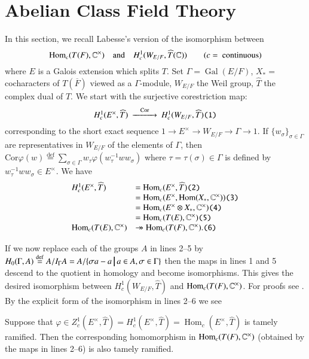 \documentclass{amsart}
\newenvironment{cthm}[1]
  {\renewcommand\thethm{\bf #1}\thm}
  {\endthm}
\def\taglet#1{\text{\tt (#1)}}
\def\Gal{\operatorname{\text{Gal}}}          %
\def\Com{{\Bbb C}}                         %
\def\suchthat{\ {\vrule width1truept height.3truecm depth.1truecm}\ }
\def\Hom{\operatorname{Hom}}         %
\def\Def{\overset{\operatorname{def}}=}   %
\def\LABESSEC{19}
\begin{document}
\section{Abelian Class Field Theory} %

In this section, we recall Labesse's version \cite{\LABESSEC} of the isomorphism
between
$$
\Hom_c(T(F),\Com^\times)\quad\text{and}\quad
H_c^1(W_{E/F},\widehat T(\Com))
\qquad (c =\text{ continuous})
$$
where $E$ is a Galois extension which splits $T$.  Set
$\Gamma=\Gal(E/F)$, $X_* =$ cocharacters of $T(\overline F)$
viewed as a $\Gamma$-module, $W_{E/F}$ the Weil group, $\widehat T$ the
complex dual of $T$. We start with the 
surjective corestriction map:
$$
\begin{CD}
H_c^1(E^\times,\widehat T)@>{\text{Cor}}>> H_c^1(W_{E/F},
\widehat T)\taglet{1}
\end{CD}
$$
corresponding to the short exact sequence
$
1\longrightarrow E^\times\longrightarrow W_{E/F}\longrightarrow
\Gamma\longrightarrow 1.
$
If $\{w_\sigma\}_{\sigma\in\Gamma}$ are 
representatives in $W_{E/F}$ of the elements
of $\Gamma$, then
$\text{Cor}\varphi(w)\Def\sum_{\sigma\in\Gamma}
w_\tau\varphi(w_\tau^{-1}ww_\sigma)$
where $\tau=\tau(\sigma)\in \Gamma$ is defined by
$w_\tau^{-1}ww_\sigma\in E^\times$.  We have
$$
\begin{array}{lll}
H_c^1(E^\times,\widehat T) &=
\Hom_c(E^\times,\widehat T)\taglet2\\
&=\Hom_c(E^\times,\Hom(X_*,\Com^\times)) \taglet3\\
&=\Hom_c(E^\times\otimes X_*,\Com^\times) \taglet4\\
&=\Hom_c(T(E),\Com^\times) \taglet5\\
\Hom_c(T(E),\Com^\times) &\twoheadrightarrow
\Hom_c(T(F),\Com^\times). \taglet6
\end{array}
$$

If we now replace each of the groups $A$ in lines 2--5
by $H_0(\Gamma,A)\Def A/I_\Gamma A
=A/\{\sigma a-a\suchthat
a\in A, \sigma\in \Gamma\}$
then the maps in lines 1 and 5 descend to the
quotient in homology and become isomorphisms.
This gives the desired isomorphism between
$H_c^1(W_{E/F},\widehat T)$ and
$\Hom_c(T(F),\Com^\times)$.  For proofs see \cite{\LABESSEC}.
By the explicit form of the isomorphism in lines
2--6 we see 

\begin{cthm}{Lemma 5.1}  Suppose that
$\varphi\in Z_c^1(E^\times,\widehat T)
=H_c^1(E^\times,\widehat T)
=\Hom_c(E^\times,\widehat T)$
is tamely ramified.  Then the corresponding homomorphism in
$\Hom_c(T(F),\Com^\times)$
(obtained by the maps in lines 2--6) is
also tamely ramified.
\end{cthm}
\end{document}
